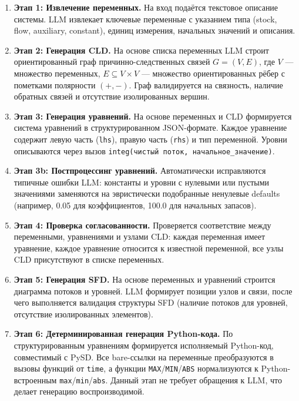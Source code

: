 \begin{enumerate}
    \item \textbf{Этап 1: Извлечение переменных.} На вход подаётся текстовое описание системы. LLM извлекает ключевые переменные с указанием типа (stock, flow, auxiliary, constant), единиц измерения, начальных значений и описания.

    \item \textbf{Этап 2: Генерация CLD.} На основе списка переменных LLM строит ориентированный граф причинно-следственных связей $G = (V, E)$, где $V$ --- множество переменных, $E \subseteq V \times V$ --- множество ориентированных рёбер с пометками полярности $(+, -)$. Граф валидируется на связность, наличие обратных связей и отсутствие изолированных вершин.

    \item \textbf{Этап 3: Генерация уравнений.} На основе переменных и CLD формируется система уравнений в структурированном JSON-формате. Каждое уравнение содержит левую часть (\texttt{lhs}), правую часть (\texttt{rhs}) и тип переменной. Уровни описываются через вызов \texttt{integ(чистый поток, начальное\_значение)}.

    \item \textbf{Этап 3b: Постпроцессинг уравнений.} Автоматически исправляются типичные ошибки LLM: константы и уровни с нулевыми или пустыми значениями заменяются на эвристически подобранные ненулевые defaults (например, 0.05 для коэффициентов, 100.0 для начальных запасов).

    \item \textbf{Этап 4: Проверка согласованности.} Проверяется соответствие между переменными, уравнениями и узлами CLD: каждая переменная имеет уравнение, каждое уравнение относится к известной переменной, все узлы CLD присутствуют в списке переменных.

    \item \textbf{Этап 5: Генерация SFD.} На основе переменных и уравнений строится диаграмма потоков и уровней. LLM формирует позиции узлов и связи, после чего выполняется валидация структуры SFD (наличие потоков для уровней, отсутствие изолированных элементов).

    \item \textbf{Этап 6: Детерминированная генерация Python-кода.} По структурированным уравнениям формируется исполняемый Python-код, совместимый с PySD. Все bare-ссылки на переменные преобразуются в вызовы функций от \texttt{time}, а функции \texttt{MAX}/\texttt{MIN}/\texttt{ABS} нормализуются к Python-встроенным \texttt{max}/\texttt{min}/\texttt{abs}. Данный этап не требует обращения к LLM, что делает генерацию воспроизводимой.


\end{enumerate}
